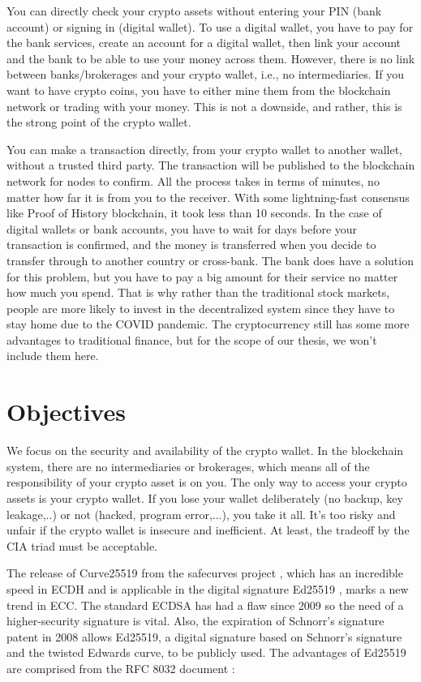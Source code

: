 You can directly check your crypto assets without entering your PIN (bank account) or signing in (digital wallet). To use a digital wallet, you have to pay for the bank services, create an account for a digital wallet, then link your account and the bank to be able to use your money across them. However, there is no link between banks/brokerages and your crypto wallet, i.e., no intermediaries. If you want to have crypto coins, you have to either mine them from the blockchain network or trading with your money. This is not a downside, and rather, this is the strong point of the crypto wallet.

You can make a transaction directly, from your crypto wallet to another wallet, without a trusted third party. The transaction will be published to the blockchain network for nodes to confirm. All the process takes in terms of minutes, no matter how far it is from you to the receiver. With some lightning-fast consensus like Proof of History blockchain, it took less than 10 seconds. In the case of digital wallets or bank accounts, you have to wait for days before your transaction is confirmed, and the money is transferred when you decide to transfer through to another country or cross-bank. The bank does have a solution for this problem, but you have to pay a big amount for their service no matter how much you spend. That is why rather than the traditional stock markets, people are more likely to invest in the decentralized system since they have to stay home due to the COVID pandemic. The cryptocurrency still has some more advantages to traditional finance, but for the scope of our thesis, we won’t include them here.

\section{Objectives}
\label{objectives}

We focus on the security and availability of the crypto wallet. In the blockchain system, there are no intermediaries or brokerages, which means all of the responsibility of your crypto asset is on you. The only way to access your crypto assets is your crypto wallet. If you lose your wallet deliberately (no backup, key leakage,..) or not (hacked, program error,...), you take it all. It’s too risky and unfair if the crypto wallet is insecure and inefficient. At least, the tradeoff by the CIA triad must be acceptable.

The release of Curve25519 from the safecurves project \cite{Bernstein2006}, which has an incredible speed in ECDH and is applicable in the digital signature Ed25519 \cite{Bernstein2011}, marks a new trend in ECC. The standard ECDSA has had a flaw since 2009 \cite{Schmidt2009} so the need of a higher-security signature is vital. Also, the expiration of Schnorr’s signature patent in 2008 allows Ed25519, a digital signature based on Schnorr’s signature and the twisted Edwards curve, to be publicly used. The advantages of Ed25519 are comprised from the RFC 8032 document \cite{Josefsson2017}:

